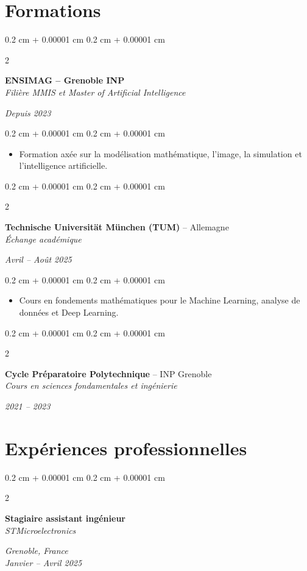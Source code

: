 \documentclass[10pt, letterpaper]{article}
\newenvironment{highlights}{
    \begin{itemize}[
        topsep=0.10 cm,
        parsep=0.10 cm,
        partopsep=0pt,
        itemsep=0pt,
        leftmargin=0.4 cm + 10pt
    ]
}{
    \end{itemize}
} %
\newenvironment{onecolentry}{
    \begin{adjustwidth}{
        0.2 cm + 0.00001 cm
    }{
        0.2 cm + 0.00001 cm
    }
}{
    \end{adjustwidth}
} %
\newenvironment{twocolentry}[2][]{
    \onecolentry
    \def\secondColumn{#2}
    \setcolumnwidth{\fill, 4.5 cm}
    \begin{paracol}{2}
}{
    \switchcolumn \raggedleft \secondColumn
    \end{paracol}
    \endonecolentry
} %
\begin{document}
\section{Formations}
\begin{twocolentry}{\textit{Depuis 2023}}
    \textbf{ENSIMAG – Grenoble INP} \\
    \textit{Filière MMIS et Master of Artificial Intelligence}
\end{twocolentry}

\vspace{0.10cm}
\begin{onecolentry}
    \begin{highlights}
        \item Formation axée sur la modélisation mathématique, l'image, la simulation et l’intelligence artificielle.
    \end{highlights}
\end{onecolentry}

\vspace{0.3cm}
\begin{twocolentry}{\textit{Avril – Août 2025}}
    \textbf{Technische Universität München (TUM)} – Allemagne \\
    \textit{Échange académique}
\end{twocolentry}

\vspace{0.10cm}
\begin{onecolentry}
    \begin{highlights}
        \item Cours en fondements mathématiques pour le Machine Learning, analyse de données et Deep Learning.
    \end{highlights}
\end{onecolentry}

\vspace{0.3cm}
\begin{twocolentry}{\textit{2021 – 2023}}
    \textbf{Cycle Préparatoire Polytechnique} – INP Grenoble \\
    \textit{Cours en sciences fondamentales et ingénierie}
\end{twocolentry}


\section{Expériences professionnelles}

\begin{twocolentry}{\textit{Grenoble, France} \\
\textit{Janvier – Avril 2025}}
    \textbf{Stagiaire assistant ingénieur} \\
    \textit{STMicroelectronics}
\end{twocolentry}
\end{document}
